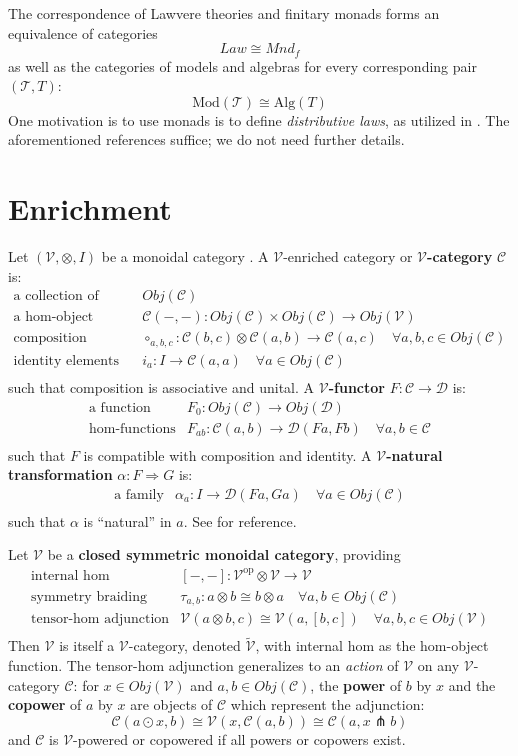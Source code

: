 \documentclass[a4paper,UKenglish]{article}
\theoremstyle{definition}
\newcommand{\Mod}{\mathrm{Mod}}
\newcommand{\Alg}{\mathrm{Alg}}
\newcommand{\op}{\mathrm{op}}
\newcommand{\V}{\mathscr{V}}
\newcommand{\C}{\mathscr{C}}
\newcommand{\D}{\mathscr{D}}
\newcommand{\T}{\mathscr{T}}
\newcommand{\pfk}{\pitchfork}
\begin{document}
The correspondence of Lawvere theories and finitary monads forms an equivalence of categories $$Law \cong Mnd_f$$ as well as the categories of models and algebras for every corresponding pair $(\T, T)$: $$\Mod(\T) \cong \Alg(T)$$ One motivation is to use monads is to define \textit{distributive laws}, as utilized in \cite{ladl}. The aforementioned references suffice; we do not need further details. 

\section{Enrichment}

Let $(\V,\otimes,I)$ be a monoidal category \cite{maclane}. A $\V$-enriched category or \textbf{$\V$-category} $\C$ is:
\[\begin{array}{rl}
\text{a collection of objects} & Obj(\C)\\
\text{a hom-object function} & \C(-,-):Obj(\C) \times Obj(\C) \to Obj(\V)\\
\text{composition morphisms} & \circ_{a,b,c}:\C(b,c) \otimes \C(a,b) \to \C(a,c) \quad \forall a,b,c \in Obj(\C)\\
\text{identity elements} & i_a:I\to\C(a,a) \quad \forall a \in Obj(\C)\\
\end{array}\]
such that composition is associative and unital. A \textbf{$\V$-functor} $F:\C \to \D$ is:
\[\begin{array}{rl}
\text{a function} & F_0: Obj(\C) \to Obj(\D)\\
\text{hom-functions} & F_{ab}: \C(a,b) \to \D(Fa,Fb) \quad \forall a,b \in \C\\
\end{array}\]
such that $F$ is compatible with composition and identity. A \textbf{$\V$-natural transformation} $\alpha: F \Rightarrow G$ is:
\[\begin{array}{rl}
\text{a family} & \alpha_a: I \to \D(Fa,Ga) \quad \forall a \in Obj(\C)\\
\end{array}\]
such that $\alpha$ is ``natural'' in $a$. See \cite{enrich} for reference.

Let $\V$ be a \textbf{closed symmetric monoidal category}, providing
\[\begin{array}{rl}
\text{internal hom} & [-,-]:\V^\op\otimes \V \to \V\\
\text{symmetry braiding} & \tau_{a,b}:a\otimes b\cong b\otimes a \quad \forall a,b \in Obj(\C)\\
\text{tensor-hom adjunction} & \V(a\otimes b,c) \cong \V(a,[b,c]) \quad \forall a,b,c \in Obj(\V)\\
\end{array}\]
Then $\V$ is itself a $\V$-category, denoted $\tilde{\V}$, with internal hom as the hom-object function. The tensor-hom adjunction generalizes to an \textit{action} of $\V$ on any $\V$-category $\C$: for $x \in Obj(\V)$ and $a,b \in Obj(\C)$, the \textbf{power} of $b$ by $x$ and the \textbf{copower} of $a$ by $x$ are objects of $\C$ which represent the adjunction:
$$\C(a\odot x,b) \cong \V(x, \C(a,b)) \cong \C(a,x\pfk b)$$
and $\C$ is $\V$-powered or copowered if all powers or copowers exist.
\end{document}
